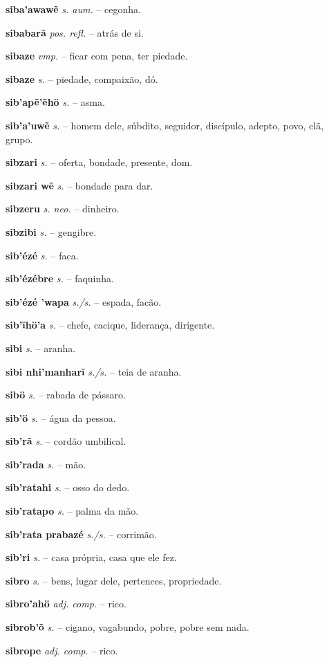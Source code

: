 \textbf{siba'awawẽ} \textit{s. aum.} -- cegonha.

\textbf{sibabarã} \textit{pos. refl.} -- atrás de si.

\textbf{sibaze} \textit{vmp.} -- ficar com pena, ter piedade.

\textbf{sibaze} \textit{s.} -- piedade, compaixão, dó.

\textbf{sib'apẽ'ẽhö} \textit{s.} -- asma.

\textbf{sib'a'uwẽ} \textit{s.} -- homem dele, súbdito, seguidor, discípulo, adepto, povo, clã, grupo.

\textbf{sibzari} \textit{s.} -- oferta, bondade, presente, dom.

\textbf{sibzari wẽ} \textit{s.} -- bondade para dar.

\textbf{sibzeru} \textit{s. neo.} -- dinheiro.

\textbf{sibzibi} \textit{s.} -- gengibre.

\textbf{sib'ézé} \textit{s.} -- faca.

\textbf{sib'ézébre} \textit{s.} -- faquinha.

\textbf{sib'ézé 'wapa} \textit{s./s.} -- espada, facão.

\textbf{sib'ĩhö'a} \textit{s.} -- chefe, cacique, liderança, dirigente.

\textbf{sibi} \textit{s.} -- aranha.

\textbf{sibi nhi'manharĩ} \textit{s./s.} -- teia de aranha.

\textbf{sibö} \textit{s.} -- rabada de pássaro.

\textbf{sib'ö} \textit{s.} -- água da pessoa.

\textbf{sib'rã} \textit{s.} -- cordão umbilical.

\textbf{sib'rada} \textit{s.} -- mão.

\textbf{sib'ratahi} \textit{s.} -- osso do dedo.

\textbf{sib'ratapo} \textit{s.} -- palma da mão.

\textbf{sib'rata prabazé} \textit{s./s.} -- corrimão.

\textbf{sib'ri} \textit{s.} -- casa própria, casa que ele fez.

\textbf{sibro} \textit{s.} -- bens, lugar dele, pertences, propriedade.

\textbf{sibro'ahö} \textit{adj. comp.} -- rico.

\textbf{sibrob'õ} \textit{s.} -- cigano, vagabundo, pobre, pobre sem nada.

\textbf{sibrope} \textit{adj. comp.} -- rico.

